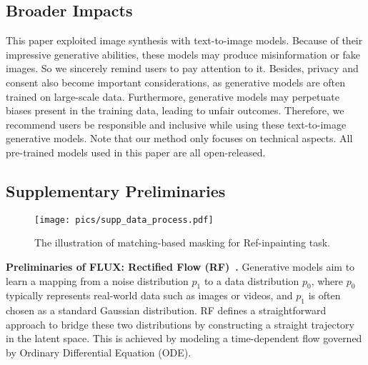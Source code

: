 \subsection{Broader Impacts}
This paper exploited image synthesis with text-to-image models. Because of their impressive generative abilities, these models may produce misinformation or fake images. 
So we sincerely remind users to pay attention to it.
Besides, privacy and consent also become important considerations, as generative models are often trained on large-scale data.
Furthermore, generative models may perpetuate biases present in the training data, leading to unfair outcomes. 
Therefore, we recommend users be responsible and inclusive while using these text-to-image generative models.
Note that our method only focuses on technical aspects. All pre-trained models used in this paper are all open-released.

\subsection{Supplementary Preliminaries}
\label{sec:data_processing}

\begin{figure}[h!]
\begin{center}
\texttt{[image: pics/supp\_data\_process.pdf]}
\vspace{-0.15in}
\end{center}
   \caption{ The illustration of matching-based masking for Ref-inpainting task.
   \label{fig:data_process}}
\vspace{-0.15in}
\end{figure}

\label{sec:preliminary_anyrefill}

\noindent\textbf{Preliminaries of FLUX: Rectified Flow (RF)~\cite{liu2022flow}.}
Generative models aim to learn a mapping from a noise distribution $p_1$ to a data distribution $p_0$, where $p_0$ typically represents real-world data such as images or videos, and $p_1$ is often chosen as a standard Gaussian distribution. RF defines a straightforward approach to bridge these two distributions by constructing a straight trajectory in the latent space. This is achieved by modeling a time-dependent flow governed by  Ordinary Differential Equation (ODE). 

